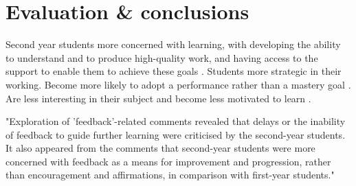\chapter{Evaluation \& conclusions}\label{ch:conc}

Second year students more concerned with learning, with developing the ability to understand and to produce high-quality work, and having access to the support to enable them to achieve these goals \citep{Zaitseva2013}. Students more strategic in their working. Become more likely to adopt a performance rather than a mastery goal \citep{Lieberman2007}. Are less interesting in their subject and become less motivated to learn \citep{Lieberman2007}.

"Exploration of 'feedback'-related comments revealed that delays or the
inability of feedback to guide further learning were criticised by the
second-year students. It also appeared from the comments that second-year
students were more concerned with feedback as a means for improvement
and progression, rather than encouragement and affirmations, in comparison
with first-year students." \citep{Zaitseva2013}
